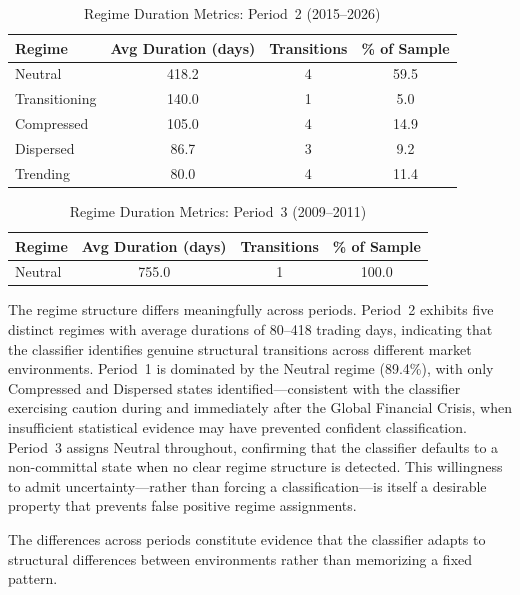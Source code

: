 \documentclass[12pt]{article}
\begin{document}
\begin{table}[H]
\centering
\caption{Regime Duration Metrics: Period~2 (2015--2026)}
\label{tab:regime2}
\begin{tabular}{l S[table-format=3.1] S[table-format=1.0] S[table-format=2.1]}
\toprule
{Regime} & {Avg Duration (days)} & {Transitions} & {\% of Sample} \\
\midrule
Neutral       & 418.2 & 4 & 59.5 \\
Transitioning & 140.0 & 1 &  5.0 \\
Compressed    & 105.0 & 4 & 14.9 \\
Dispersed     &  86.7 & 3 &  9.2 \\
Trending      &  80.0 & 4 & 11.4 \\
\bottomrule
\end{tabular}
\end{table}

\begin{table}[H]
\centering
\caption{Regime Duration Metrics: Period~3 (2009--2011)}
\label{tab:regime3}
\begin{tabular}{l S[table-format=3.1] S[table-format=1.0] S[table-format=3.1]}
\toprule
{Regime} & {Avg Duration (days)} & {Transitions} & {\% of Sample} \\
\midrule
Neutral & 755.0 & 1 & 100.0 \\
\bottomrule
\end{tabular}
\end{table}

The regime structure differs meaningfully across periods.
Period~2 exhibits five distinct regimes with average durations of 80--418 trading days, indicating that the classifier identifies genuine structural transitions across different market environments.
Period~1 is dominated by the Neutral regime (89.4\%), with only Compressed and Dispersed states identified---consistent with the classifier exercising caution during and immediately after the Global Financial Crisis, when insufficient statistical evidence may have prevented confident classification.
Period~3 assigns Neutral throughout, confirming that the classifier defaults to a non-committal state when no clear regime structure is detected.
This willingness to admit uncertainty---rather than forcing a classification---is itself a desirable property that prevents false positive regime assignments.

The differences across periods constitute evidence that the classifier adapts to structural differences between environments rather than memorizing a fixed pattern.
\end{document}
